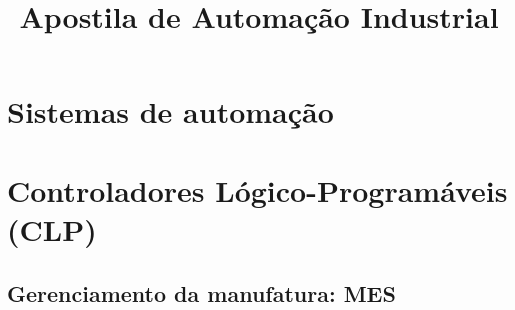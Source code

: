 \documentclass[12pt,oneside]{report}
\title{Apostila de Automação Industrial}
\begin{document}
\maketitle
\tableofcontents
\chapter{Sistemas de automação}



\chapter{Controladores Lógico-Programáveis (CLP)}








%

\section{Gerenciamento da manufatura: MES}

\end{document}
